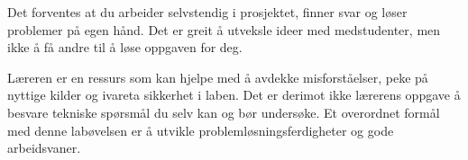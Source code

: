 Det forventes at du arbeider selvstendig i prosjektet, finner svar og løser problemer på egen hånd. Det er greit å utveksle ideer med medstudenter, men ikke å få andre til å løse oppgaven for deg.

Læreren er en ressurs som kan hjelpe med å avdekke misforståelser, peke på nyttige kilder og ivareta sikkerhet i laben. Det er derimot ikke lærerens oppgave å besvare tekniske spørsmål du selv kan og bør undersøke. Et overordnet formål med denne labøvelsen er å utvikle problemløsningsferdigheter og gode arbeidsvaner.
















